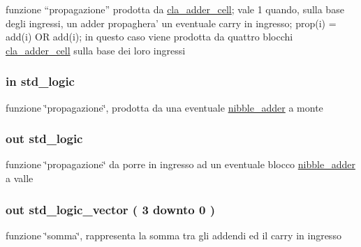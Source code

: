 funzione “propagazione” prodotta da \hyperlink{classcla__adder__cell}{cla\+\_\+adder\+\_\+cell}; vale 1 quando, sulla base degli ingressi, un adder propaghera' un eventuale carry in ingresso; prop(i) = add(i) O\+R add(i); in questo caso viene prodotta da quattro blocchi \hyperlink{classcla__adder__cell}{cla\+\_\+adder\+\_\+cell} sulla base dei loro ingressi 

\hypertarget{group___nibble_adder_ga422e8e7ee01fc7ac7b7390cd2ad8c87b}{
\subsubsection[{propin}]{ {\bfseries \textcolor{vhdlchar}{in}\textcolor{vhdlchar}{ }} {\bfseries \textcolor{vhdlchar}{std\+\_\+logic}\textcolor{vhdlchar}{ }} \hspace{0.3cm}{\ttfamily [Port]}}}\label{group___nibble_adder_ga422e8e7ee01fc7ac7b7390cd2ad8c87b}


funzione \char`\"{}propagazione\char`\"{}, prodotta da una eventuale \hyperlink{classnibble__adder}{nibble\+\_\+adder} a monte 

\hypertarget{group___nibble_adder_ga5957c9cdd706cafd2da8855133a002c9}{
\subsubsection[{propout}]{ {\bfseries \textcolor{vhdlchar}{out}\textcolor{vhdlchar}{ }} {\bfseries \textcolor{vhdlchar}{std\+\_\+logic}\textcolor{vhdlchar}{ }} \hspace{0.3cm}{\ttfamily [Port]}}}\label{group___nibble_adder_ga5957c9cdd706cafd2da8855133a002c9}


funzione \char`\"{}propagazione\char`\"{} da porre in ingresso ad un eventuale blocco \hyperlink{classnibble__adder}{nibble\+\_\+adder} a valle 

\hypertarget{group___nibble_adder_gadfe538323c3296159dd3b383325a996b}{
\subsubsection[{sum}]{ {\bfseries \textcolor{vhdlchar}{out}\textcolor{vhdlchar}{ }} {\bfseries \textcolor{vhdlchar}{std\+\_\+logic\+\_\+vector}\textcolor{vhdlchar}{ }\textcolor{vhdlchar}{(}\textcolor{vhdlchar}{ }\textcolor{vhdlchar}{ } \textcolor{vhdldigit}{3} \textcolor{vhdlchar}{ }\textcolor{vhdlchar}{downto}\textcolor{vhdlchar}{ }\textcolor{vhdlchar}{ } \textcolor{vhdldigit}{0} \textcolor{vhdlchar}{ }\textcolor{vhdlchar}{)}\textcolor{vhdlchar}{ }} \hspace{0.3cm}{\ttfamily [Port]}}}\label{group___nibble_adder_gadfe538323c3296159dd3b383325a996b}


funzione \char`\"{}somma\char`\"{}, rappresenta la somma tra gli addendi ed il carry in ingresso 

